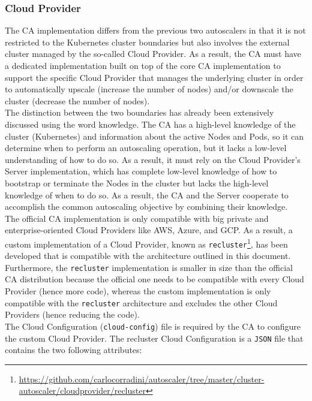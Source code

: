 \subsubsection{Cloud Provider}
\label{subsubsec:implementation_autoscaling_cluster_autoscaler_cloud_provider}

The CA implementation differs from the previous two autoscalers in that it is
not restricted to the Kubernetes cluster boundaries but also involves the
external cluster managed by the so-called Cloud Provider. As a result, the CA
must have a dedicated implementation built on top of the core CA implementation
to support the specific Cloud Provider that manages the underlying cluster in
order to automatically upscale (increase the number of nodes) and/or downscale
the cluster (decrease the number of nodes). \\ %
The distinction between the two boundaries has already been extensively
discussed using the word knowledge. The CA has a high-level knowledge of the cluster
(Kubernetes) and information about the active Nodes and Pods, so it can
determine when to perform an autoscaling operation, but it lacks a low-level understanding
of how to do so. As a result, it must rely on the Cloud Provider's Server implementation,
which has complete low-level knowledge of how to bootstrap or terminate the
Nodes in the cluster but lacks the high-level knowledge of when to do so. As a result,
the CA and the Server cooperate to accomplish the common autoscaling objective
by combining their knowledge. \\ %
The official CA implementation is only compatible with big private and
enterprise-oriented Cloud Providers like AWS, Azure, and GCP. As a result, a
custom implementation of a Cloud Provider, known as \texttt{recluster}\footnote{\url{https://github.com/carlocorradini/autoscaler/tree/master/cluster-autoscaler/cloudprovider/recluster}},
has been developed that is compatible with the architecture outlined in this document.
Furthermore, the \texttt{recluster} implementation is smaller in size than the
official CA distribution because the official one needs to be compatible with
every Cloud Provider (hence more code), whereas the custom implementation is only
compatible with the \texttt{recluster} architecture and excludes the other Cloud
Providers (hence reducing the code). \\ %
The Cloud Configuration (\texttt{cloud-config}) file is required by the CA to configure
the custom Cloud Provider. The recluster Cloud Configuration is a \texttt{JSON} file
that contains the two following attributes:
